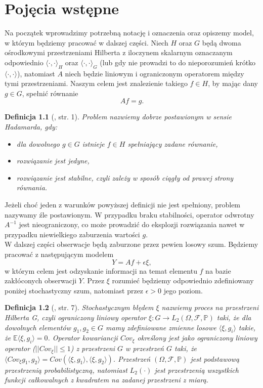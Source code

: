 \documentclass[man,mfiu]{mgrwms}
\newtheorem{df}{Definicja}[chapter]
\begin{document}
\chapter{Pojęcia wstępne}\label{PW}
Na początek wprowadzimy potrzebną notację i oznaczenia oraz opiszemy model, w którym będziemy pracować w dalszej części. 
Niech $H$ oraz $G$ będą dwoma ośrodkowymi przestrzeniami Hilberta z iloczynem skalarnym oznaczanym odpowiednio $\langle \cdot,\cdot \rangle_H$ oraz $\langle \cdot,\cdot \rangle_G$ (lub gdy nie prowadzi to do nieporozumień krótko $\langle \cdot,\cdot \rangle$), natomiast $A$ niech będzie liniowym i ograniczonym operatorem między tymi przestrzeniami. Naszym celem jest znalezienie takiego $f\in H$, by mając dany $g\in G$, spełnić równanie
\begin{displaymath}
Af=g.
\end{displaymath}
\begin{df}[\cite{szkutnik}, str. 1] Problem nazwiemy dobrze postawionym w sensie Hadamarda, gdy:
\begin{itemize}
\item dla dowolnego $g\in G$ istnieje $f\in H$ spełniający zadane równanie,
\item rozwiązanie jest jedyne,
\item rozwiązanie jest stabilne, czyli zależy w sposób ciągły od prawej strony równania.
\end{itemize}
\end{df}
Jeżeli choć jeden z warunków powyższej definicji nie jest spełniony, problem nazywamy źle postawionym. W przypadku braku stabilności, operator odwrotny $A^{-1}$ jest nieograniczony, co może prowadzić do eksplozji rozwiązania nawet w przypadku niewielkiego zaburzenia wartości $g$.\\
\indent W dalszej części obserwacje będą zaburzone przez pewien losowy szum. Będziemy pracować z następującym modelem 
\begin{equation}\label{Af}
Y=Af+\epsilon\xi,
\end{equation}
w którym celem jest odzyskanie informacji na temat elementu $f$ na bazie zakłóconych obserwacji $Y$. Przez $\xi$ rozumieć będziemy odpowiednio zdefiniowany poniżej stochastyczny szum, natomiast przez $\epsilon>0$ jego poziom.
\begin{df}[\cite{iphde}, str. 7]\label{szum} Stochastycznym błędem $\xi$ nazwiemy proces na przestrzeni Hilberta G, czyli ograniczony liniowy operator $\xi\colon G\to L_2(\Omega, \mathcal{F},\mathbb{P})$ taki, że dla dowolnych elementów $g_1,g_2\in G$ mamy zdefiniowane zmienne losowe $\langle \xi, g_i\rangle$ takie, że $\mathbb{E}\langle \xi, g_i\rangle =0$. Operator kowariancji $Cov_{\xi}$ określony jest jako ograniczony liniowy operator ($||Cov_{\xi}||\leq 1$) z przestrzeni $G$ w przestrzeń $G$ taki, że $ \langle Cov_{\xi}g_1,g_2\rangle=Cov(\langle \xi,g_1\rangle,\langle \xi,g_2\rangle)$. Przestrzeń $(\Omega, \mathcal{F},\mathbb{P})$ jest podstawową przestrzenią probabilistyczną, natomiast  $L_2(\cdot)$ jest przestrzenią wszystkich funkcji całkowalnych z kwadratem na zadanej przestrzeni z miarą.
\end{df}
\end{document}
